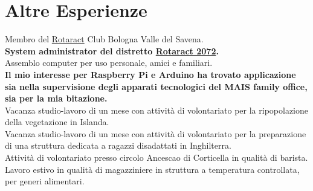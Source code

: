 \documentclass[%
               doublesided,
               paper=a4,
               fontsize=10pt
              ]{Rubini-Mattia-resume}
\begin{document}
    \section{Altre Esperienze}
        Membro del \href{https://en.wikipedia.org/wiki/Rotaract}{Rotaract} Club Bologna Valle del Savena.
        \\\textbf{System administrator del distretto \href{https://rotaract2072.com/}{Rotaract 2072}.}
        \\Assemblo computer per uso personale, amici e familiari.
        \\ \textbf{Il mio interesse per Raspberry Pi e Arduino ha trovato applicazione sia nella supervisione degli apparati tecnologici del MAIS family office, sia per la mia bitazione.}
        \\Vacanza studio-lavoro di un mese con attività di volontariato per la ripopolazione della vegetazione in Islanda.
        \\Vacanza studio-lavoro di un mese con attività di volontariato per la preparazione di una struttura dedicata a ragazzi disadattati in Inghilterra.
        \\Attività di volontariato presso circolo Ancescao di Corticella in qualità di barista.
        \\Lavoro estivo in qualità di magazziniere in struttura a temperatura controllata, per generi alimentari.




\end{document}
